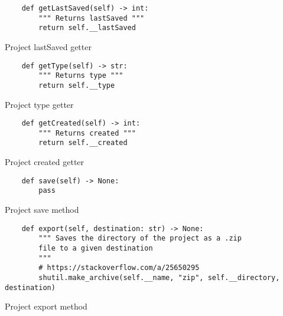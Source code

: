 \newpage
\begin{listing}[!h]
    \begin{verbatim}
    def getLastSaved(self) -> int:
        """ Returns lastSaved """
        return self.__lastSaved
    \end{verbatim}
    \caption{Project lastSaved getter}
    \label{sc:project-lastsaved-getter}
\end{listing}

\newpage
\begin{listing}[!h]
    \begin{verbatim}
    def getType(self) -> str:
        """ Returns type """
        return self.__type
    \end{verbatim}
    \caption{Project type getter}
    \label{sc:project-type-getter}
\end{listing}

\newpage
\begin{listing}[!h]
    \begin{verbatim}
    def getCreated(self) -> int:
        """ Returns created """
        return self.__created
    \end{verbatim}
    \caption{Project created getter}
    \label{sc:project-created-getter}
\end{listing}

\newpage
\begin{listing}[!h]
    \begin{verbatim}
    def save(self) -> None:
        pass
    \end{verbatim}
    \caption{Project save method}
    \label{sc:project-save-method}
\end{listing}

\newpage
\begin{listing}[!h]
    \begin{verbatim}
    def export(self, destination: str) -> None:
        """ Saves the directory of the project as a .zip 
        file to a given destination
        """
        # https://stackoverflow.com/a/25650295
        shutil.make_archive(self.__name, "zip", self.__directory, destination)
    \end{verbatim}
    \caption{Project export method}
    \label{sc:project-export-method}
\end{listing}

